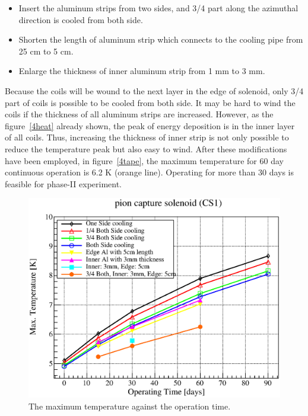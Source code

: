 \begin{itemize}
 \setlength{\itemsep}{-5pt}
 \item Insert the aluminum strips from two sides, and 3/4 part along the azimuthal direction is cooled from both side.
 \item Shorten the length of aluminum strip which connects to the cooling pipe from 25 cm to 5 cm.
 \item Enlarge the thickness of inner aluminum strip from 1 mm to 3 mm. 
\end{itemize}
Because the coils will be wound to the next layer in the edge of solenoid, only 3/4 part of coils is possible to be cooled from both side.
It may be hard to wind the coils if the thickness of all aluminum strips are increased.
However, as the figure~\ref{4heat} already shown, the peak of energy deposition is in the inner layer of all coils.
Thus, increasing the thickness of inner strip is not only possible to reduce the temperature peak but also easy to wind.
After these modifications have been employed, in figure~\ref{4tape}, the maximum temperature for 60 day continuous operation is 6.2 K (orange line).
Operating for more than 30 days is feasible for phase-II experiment.
  \begin{figure}[H]
   \centering
   \includegraphics[scale=0.45]{chapter5/fig/maxtemp.eps}
   \caption{ The maximum temperature against the operation time.}
   \label{4maxtemp}
  \end{figure}

